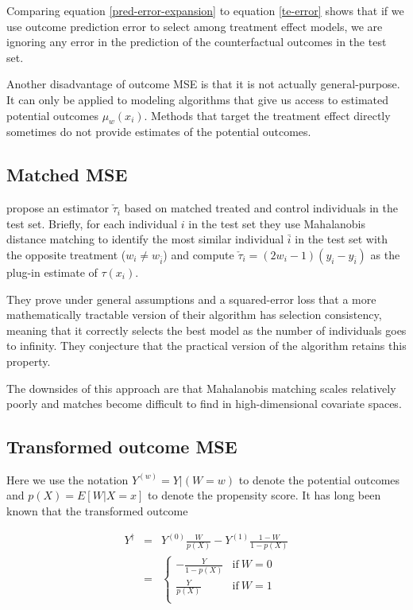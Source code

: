 Comparing equation \ref{pred-error-expansion} to equation \ref{te-error} shows that if we use outcome prediction error to select among treatment effect models, we are ignoring any error in the prediction of the counterfactual outcomes in the test set. 

Another disadvantage of outcome MSE is that it is not actually general-purpose. It can only be applied to modeling algorithms that give us access to estimated potential outcomes $\mu_w(x_i)$. Methods that target the treatment effect directly sometimes do not provide estimates of the potential outcomes.

\subsection{Matched MSE}

\citet{Rolling:2013kz} propose an estimator $\check \tau_i$ based on matched treated and control individuals in the test set. Briefly, for each individual $i$ in the test set they use Mahalanobis distance matching to identify the most similar individual $\bar{i}$ in the test set with the opposite treatment ($w_i \ne w_{\bar i}$) and compute $\check \tau_i = (2w_i -1)(y_i - y_{\bar i})$ as the plug-in estimate of $\tau(x_i)$. 

They prove under general assumptions and a squared-error loss that a more mathematically tractable version of their algorithm has selection consistency, meaning that it correctly selects the best model as the number of individuals goes to infinity. They conjecture that the practical version of the algorithm retains this property.

The downsides of this approach are that Mahalanobis matching scales relatively poorly and matches become difficult to find in high-dimensional covariate spaces.

\subsection{Transformed outcome MSE}

Here we use the notation $Y^{(w)} = Y|(W=w)$ to denote the potential outcomes and $p(X) = E[W|X=x]$ to denote the propensity score. It has long been known that the transformed outcome 

\begin{equation}
	\begin{array}{rcl}
	Y^{\dagger}  & = & Y^{(0)} \frac{W}{p(X)} - Y^{(1)} \frac{1-W}{1-p(X)} \\
	& = &
	\begin{cases}
		-\frac{Y}{1-p(X)} & \text{if} \ W=0 \\
		\frac{Y}{p(X)} & \text{if} \ W=1\\
	\end{cases} \\
	\end{array}
\end{equation}

